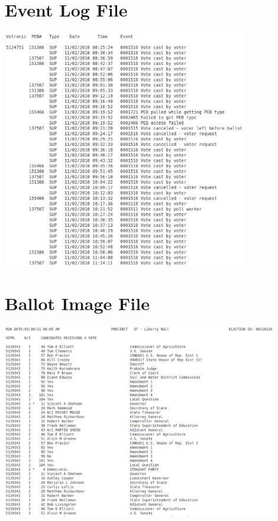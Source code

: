 \documentclass[letterpaper,twocolumn,10pt]{article}
\begin{document}
{\footnotesize 
}

\clearpage
\onecolumn
\begin{center}
\appendix
\section{Event Log File}\label{app:el} 
\includegraphics[width=0.8\textwidth]{eventLog.eps}

\clearpage
\section{Ballot Image File}\label{app:bi}
\includegraphics[width=0.9\textwidth]{ballot.eps}


\end{center}
\end{document}

